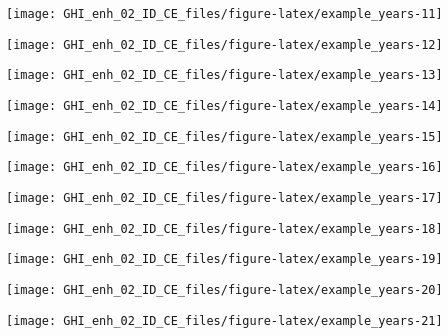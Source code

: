 \documentclass[
  10pt,
  a4paper,oneside]{article}
\begin{document}
\begin{center}\texttt{[image: GHI\_enh\_02\_ID\_CE\_files/figure-latex/example\_years-11]} \end{center}

\begin{center}\texttt{[image: GHI\_enh\_02\_ID\_CE\_files/figure-latex/example\_years-12]} \end{center}

\begin{center}\texttt{[image: GHI\_enh\_02\_ID\_CE\_files/figure-latex/example\_years-13]} \end{center}

\begin{center}\texttt{[image: GHI\_enh\_02\_ID\_CE\_files/figure-latex/example\_years-14]} \end{center}

\begin{center}\texttt{[image: GHI\_enh\_02\_ID\_CE\_files/figure-latex/example\_years-15]} \end{center}

\begin{center}\texttt{[image: GHI\_enh\_02\_ID\_CE\_files/figure-latex/example\_years-16]} \end{center}

\begin{center}\texttt{[image: GHI\_enh\_02\_ID\_CE\_files/figure-latex/example\_years-17]} \end{center}

\begin{center}\texttt{[image: GHI\_enh\_02\_ID\_CE\_files/figure-latex/example\_years-18]} \end{center}

\begin{center}\texttt{[image: GHI\_enh\_02\_ID\_CE\_files/figure-latex/example\_years-19]} \end{center}

\begin{center}\texttt{[image: GHI\_enh\_02\_ID\_CE\_files/figure-latex/example\_years-20]} \end{center}

\begin{center}\texttt{[image: GHI\_enh\_02\_ID\_CE\_files/figure-latex/example\_years-21]} \end{center}
\end{document}
